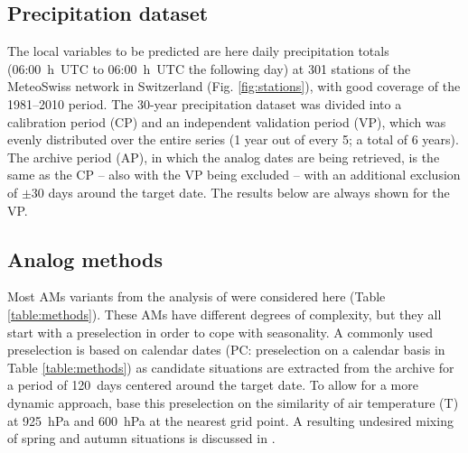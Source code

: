 \documentclass[alpha-refs]{wiley-article}
\begin{document}
\subsection{Precipitation dataset}
\label{sec:precipitation}

The local variables to be predicted are here daily precipitation totals (06:00~h~UTC to 06:00~h~UTC the following day) at 301 stations of the MeteoSwiss network in Switzerland (Fig. \ref{fig:stations}), with good coverage of the 1981--2010 period. The 30-year precipitation dataset was divided into a calibration period (CP) and an independent validation period (VP), which was evenly distributed over the entire series (1 year out of every 5; a total of 6 years). The archive period (AP), in which the analog dates are being retrieved, is the same as the CP -- also with the VP being excluded -- with an additional exclusion of $\pm30$ days around the target date. The results below are always shown for the VP.


\subsection{Analog methods}
\label{sec:ams}

Most AMs variants from the analysis of \cite{Horton2018b} were considered here (Table \ref{table:methods}). These AMs have different degrees of complexity, but they all start with a preselection in order to cope with seasonality. A commonly used preselection is based on calendar dates (PC: preselection on a calendar basis in Table \ref{table:methods}) as candidate situations are extracted from the archive for a period of 120~days centered around the target date. To allow for a more dynamic approach, \citet{BenDaoud2016} base this preselection on the similarity of air temperature (T) at 925~hPa and 600~hPa at the nearest grid point. A resulting undesired mixing of spring and autumn situations is discussed in \citet{Caillouet2016}. 
\end{document}
